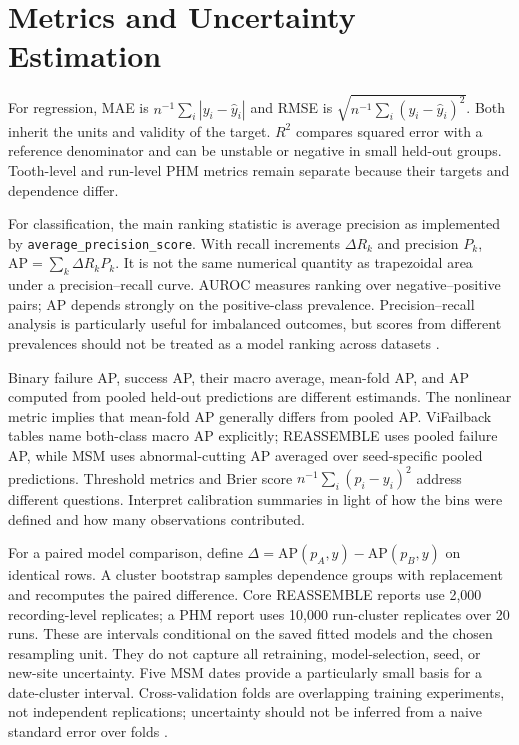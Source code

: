 \section{Metrics and Uncertainty Estimation}
For regression, MAE is $n^{-1}\sum_i|y_i-\hat y_i|$ and RMSE is $\sqrt{n^{-1}\sum_i(y_i-\hat y_i)^2}$. Both inherit the units and validity of the target. $R^2$ compares squared error with a reference denominator and can be unstable or negative in small held-out groups. Tooth-level and run-level PHM metrics remain separate because their targets and dependence differ.

For classification, the main ranking statistic is average precision as implemented by \texttt{average\_precision\_score}. With recall increments $\Delta R_k$ and precision $P_k$, $\mathrm{AP}=\sum_k\Delta R_kP_k$. It is not the same numerical quantity as trapezoidal area under a precision--recall curve. AUROC measures ranking over negative--positive pairs; AP depends strongly on the positive-class prevalence. Precision--recall analysis is particularly useful for imbalanced outcomes, but scores from different prevalences should not be treated as a model ranking across datasets \citep{Saito2015PrecisionRecall}.

Binary failure AP, success AP, their macro average, mean-fold AP, and AP computed from pooled held-out predictions are different estimands. The nonlinear metric implies that mean-fold AP generally differs from pooled AP. ViFailback tables name both-class macro AP explicitly; REASSEMBLE uses pooled failure AP, while MSM uses abnormal-cutting AP averaged over seed-specific pooled predictions. Threshold metrics and Brier score $n^{-1}\sum_i(p_i-y_i)^2$ address different questions. Interpret calibration summaries in light of how the bins were defined and how many observations contributed.

For a paired model comparison, define $\Delta=\mathrm{AP}(p_A,y)-\mathrm{AP}(p_B,y)$ on identical rows. A cluster bootstrap samples dependence groups with replacement and recomputes the paired difference. Core REASSEMBLE reports use 2,000 recording-level replicates; a PHM report uses 10,000 run-cluster replicates over 20 runs. These are intervals conditional on the saved fitted models and the chosen resampling unit. They do not capture all retraining, model-selection, seed, or new-site uncertainty. Five MSM dates provide a particularly small basis for a date-cluster interval. Cross-validation folds are overlapping training experiments, not independent replications; uncertainty should not be inferred from a naive standard error over folds \citep{Bengio2004CVVariance}.


